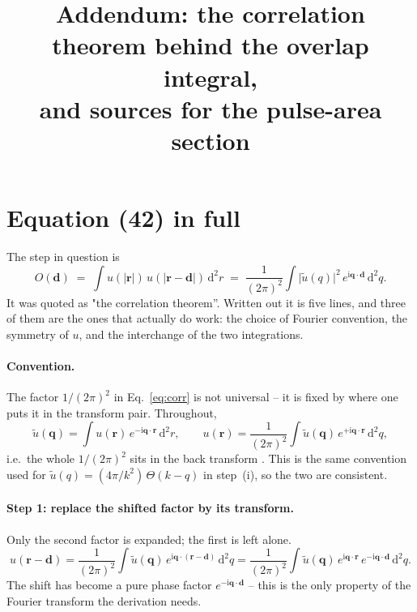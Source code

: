 \documentclass[11pt,a4paper]{article}
\title{Addendum: the correlation theorem behind the overlap integral,\\
       and sources for the pulse-area section}
\author{}\date{}
\newcommand{\dd}{\mathrm d}
\begin{document}
\maketitle

\section{Equation (42) in full}

The step in question is
\begin{equation}
O(\mathbf d)\;=\;\int\! u(|\mathbf r|)\,u(|\mathbf r-\mathbf d|)\,\dd^2r
\;=\;\frac{1}{(2\pi)^2}\int\!\bigl|\tilde u(q)\bigr|^2\,
      e^{\mathrm i\mathbf q\cdot\mathbf d}\,\dd^2q .
\label{eq:corr}
\end{equation}
It was quoted as "the correlation theorem''. Written out it is five lines, and
three of them are the ones that actually do work: the choice of Fourier
convention, the symmetry of $u$, and the interchange of the two integrations.

\paragraph{Convention.} The factor $1/(2\pi)^2$ in Eq.~\eqref{eq:corr} is not
universal -- it is fixed by where one puts it in the transform pair. Throughout,
\begin{equation}
\tilde u(\mathbf q)=\int\! u(\mathbf r)\,e^{-\mathrm i\mathbf q\cdot\mathbf r}\,\dd^2r ,
\qquad
u(\mathbf r)=\frac{1}{(2\pi)^2}\int\!\tilde u(\mathbf q)\,
             e^{+\mathrm i\mathbf q\cdot\mathbf r}\,\dd^2q ,
\label{eq:conv}
\end{equation}
i.e.\ the whole $1/(2\pi)^2$ sits in the back transform \cite[Ch.~2]{goodman2017}.
This is the same convention used for $\tilde u(q)=(4\pi/k^2)\,\Theta(k-q)$ in
step~(i), so the two are consistent.

\paragraph{Step 1: replace the shifted factor by its transform.}
Only the second factor is expanded; the first is left alone.
\begin{equation}
u(\mathbf r-\mathbf d)
=\frac{1}{(2\pi)^2}\int\!\tilde u(\mathbf q)\,
 e^{\mathrm i\mathbf q\cdot(\mathbf r-\mathbf d)}\,\dd^2q
=\frac{1}{(2\pi)^2}\int\!\tilde u(\mathbf q)\,
 e^{\mathrm i\mathbf q\cdot\mathbf r}\,e^{-\mathrm i\mathbf q\cdot\mathbf d}\,\dd^2q .
\end{equation}
The shift has become a pure phase factor $e^{-\mathrm i\mathbf q\cdot\mathbf d}$
-- this is the only property of the Fourier transform the derivation needs.
\end{document}
